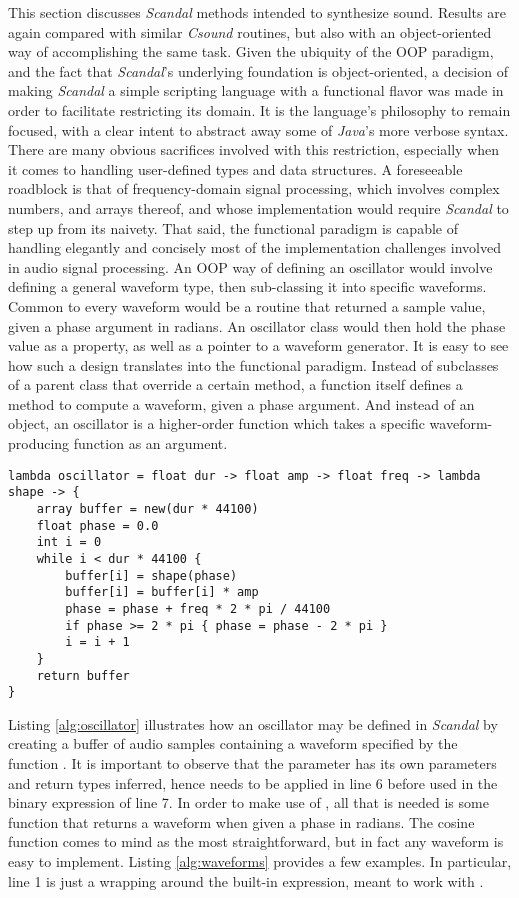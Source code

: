 This section discusses \emph{Scandal} methods intended to synthesize sound. Results are again compared with similar \emph{Csound} routines, but also with an object-oriented way of accomplishing the same task. Given the ubiquity of the OOP paradigm, and the fact that \emph{Scandal}'s underlying foundation is object-oriented, a decision of making \emph{Scandal} a simple scripting language with a functional flavor was made in order to facilitate restricting its domain. It is the language's philosophy to remain focused, with a clear intent to abstract away some of \emph{Java}'s more verbose syntax. There are many obvious sacrifices involved with this restriction, especially when it comes to handling user-defined types and data structures. A foreseeable roadblock is that of frequency-domain signal processing, which involves complex numbers, and arrays thereof, and whose implementation would require \emph{Scandal} to step up from its naivety. That said, the functional paradigm is capable of handling elegantly and concisely most of the implementation challenges involved in audio signal processing. An OOP way of defining an oscillator would involve defining a general waveform type, then sub-classing it into specific waveforms. Common to every waveform would be a routine that returned a sample value, given a phase argument in radians. An oscillator class would then hold the phase value as a property, as well as a pointer to a waveform generator. It is easy to see how such a design translates into the functional paradigm. Instead of subclasses of a parent class that override a certain method, a function itself defines a method to compute a waveform, given a phase argument. And instead of an object, an oscillator is a higher-order function which takes a specific waveform-producing function as an argument.

\begin{lstlisting}[emph={lambda,float,int,array,new,pi,while,if,return},emphstyle={\textbf},caption={Defining an oscillator.},label={alg:oscillator}]
lambda oscillator = float dur -> float amp -> float freq -> lambda shape -> {
	array buffer = new(dur * 44100)
	float phase = 0.0
	int i = 0
	while i < dur * 44100 {
		buffer[i] = shape(phase)
		buffer[i] = buffer[i] * amp
		phase = phase + freq * 2 * pi / 44100
		if phase >= 2 * pi { phase = phase - 2 * pi }
		i = i + 1
	}
	return buffer
}
\end{lstlisting}

Listing \ref{alg:oscillator} illustrates how an oscillator may be defined in \emph{Scandal} by creating a buffer of audio samples containing a waveform specified by the function . It is important to observe that the parameter  has its own parameters and return types inferred, hence needs to be applied in line 6 before used in the binary expression of line 7. In order to make use of , all that is needed is some function that returns a waveform when given a phase in radians. The cosine function comes to mind as the most straightforward, but in fact any waveform is easy to implement. Listing \ref{alg:waveforms} provides a few examples. In particular, line 1 is just a wrapping around the built-in  expression, meant to work with .

